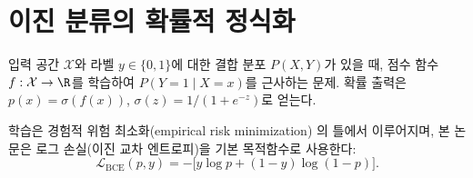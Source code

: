 
\section{이진 분류의 확률적 정식화}
\label{sec:bg-classification}

\begin{definition}[이진 분류 문제]
입력 공간 $\mathcal{X}$와 라벨 $y \in \{0,1\}$에 대한 결합 분포 $P(X, Y)$가 있을 때, 점수 함수 $f: \mathcal{X} \to \R$를 학습하여 $P(Y=1 \mid X=x)$를 근사하는 문제. 확률 출력은 $p(x) = \sigma(f(x))$, $\sigma(z) = 1/(1+e^{-z})$로 얻는다.
\end{definition}

학습은 경험적 위험 최소화(empirical risk minimization) \cite{vapnik1998statistical}의 틀에서 이루어지며, 본 논문은 로그 손실(이진 교차 엔트로피)을 기본 목적함수로 사용한다:
\begin{equation}
  \mathcal{L}_{\mathrm{BCE}}(p, y) = -\big[y \log p + (1-y)\log(1-p)\big].
  \label{eq:bce}
\end{equation}
